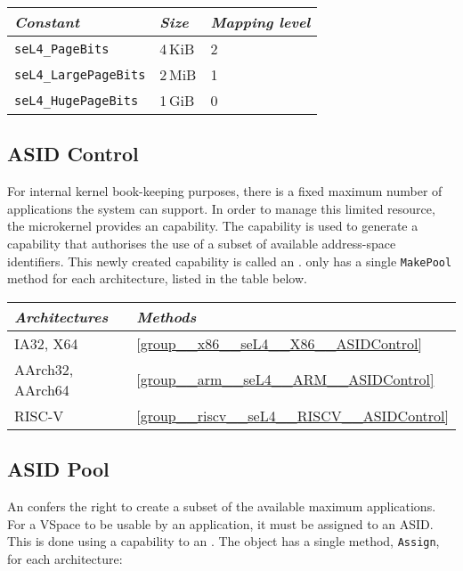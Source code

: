 \begin{tabularx}{\textwidth}{Xll} \toprule
    \emph{Constant}             & \emph{Size} & \emph{Mapping level} \\ \midrule
    \texttt{seL4\_PageBits}      & 4\,KiB      & 2                   \\
    \texttt{seL4\_LargePageBits} & 2\,MiB      & 1                   \\
    \texttt{seL4\_HugePageBits}  & 1\,GiB      & 0                   \\
    \bottomrule
\end{tabularx}

\subsection{ASID Control}

For internal kernel book-keeping purposes, there is a fixed maximum
number of applications the system can support.  In order to manage
this limited resource, the microkernel provides an 
capability. The  capability is used to generate a
capability that authorises the use of a subset of available address-space identifiers.
This newly created capability is called an
.  only has a single \texttt{MakePool} method for each
architecture, listed in the table below.

\begin{tabularx}{\textwidth}{Xl} \toprule
\emph{Architectures} & \emph{Methods} \\ \midrule
IA32, X64            & \autoref{group__x86__seL4__X86__ASIDControl} \\
AArch32, AArch64     & \autoref{group__arm__seL4__ARM__ASIDControl} \\
RISC-V               & \autoref{group__riscv__seL4__RISCV__ASIDControl} \\
\bottomrule
\end{tabularx}

\subsection{ASID Pool}

An  confers the right to create a subset of the available
maximum applications. For a VSpace to be usable by an application, it
must be assigned to an ASID. This is done using a capability to an
. The  object has a single method, \texttt{Assign}, for each
architecture:

